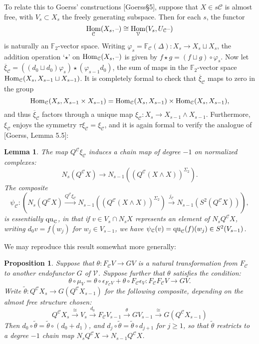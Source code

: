 \documentclass[11pt]{amsart}
\theoremstyle{plain}
\newtheorem{lem}[thm]{Lemma}
\newtheorem{prop}[thm]{Proposition}
\theoremstyle{definition}
\DeclareMathOperator{\Hom}{Hom}
\newcommand{\DASH}{\textup{--}}
\let\phi\varphi
\renewcommand{\to}{\longrightarrow}
\newcommand{\calC}{\mathcal{C}}
\newcommand{\calV}{\mathcal{V}}
\theoremstyle{plain}
\newcommand{\vect}[2]{\calV^{#1}_{#2}}
\newcommand{\quadratic}{\textup{qu}}
\newcommand{\F}{\mathbb{F}}
\begin{document}
\begin{Conventions and notation}
To relate this to Goerss' constructions [Goerss\S5], suppose that $X\in s\calC$ is almost free, with $V_s\subset X_s$ the freely generating subspace. Then for each $s$, the functor 
\[\Hom_\calC(X_s,\DASH)\cong \Hom_\calV(V_s,U_\calC\DASH)\]
is naturally an $\F_2$-vector space. Writing $\phi_s=\F_\calC(\Delta):X_s\to X_s\sqcup X_s$, the addition operation `$\star$' on $\Hom_\calC(X_s,\DASH)$ is given by $f\star g= (f\sqcup g)\circ\phi_s$. Now let
$\overline{\xi}_\calC=((d_0\sqcup d_0)\phi_s)\star(\phi_{s-1}d_0)$, the sum of maps in the $\F_2$-vector space $\textup{Hom}_\calC(X_s,X_{s-1}\sqcup X_{s-1})$. It is completely formal to check that $\overline{\xi}_\calC$ maps to zero in the group
\[\textup{Hom}_\calC(X_s,X_{s-1}\times X_{s-1})=\textup{Hom}_\calC(X_s,X_{s-1})\times \textup{Hom}_\calC(X_s,X_{s-1}),\]
and thus $\overline{\xi}_\calC$ factors through a unique map $\xi_\calC:X_s\to X_{s-1}\wedge X_{s-1}$. Furthermore, $\xi_\calC$ enjoys the symmetry $\tau\xi_\calC=\xi_\calC$, and it is again formal to verify the analogue of [Goerss, Lemma 5.5]:
\begin{lem}\label{psi is basically the quadratic part}
The map $Q^\calC\xi_\calC$ induces a chain map of degree $-1$ on normalized complexes:
\[N_s(Q^{\calC}X)\to N_{s-1}((Q^{\calC}(X\wedge X))^{\Sigma_2}).\]
The composite
\[\psi_\calC:\left(N_s(Q^{\calC}X)\overset{Q^\calC\xi_\calC}{\to} N_{s-1}((Q^{\calC}(X\wedge X))^{\Sigma_2})\overset{j_\calC}{\to} N_{s-1}(S^2(Q^{\calC}X))\right),\]
is essentially $\quadratic_\calC$, in that if $v\in V_s\cap N_sX$ represents an element of $N_sQ^\calC X$, writing $d_0v=f(w_j)$ for $w_j\in V_{s-1}$, we have $\psi_\calC(v)=\quadratic_\calC(f)(w_j)\in S^2(V_{s-1})$.
\end{lem}
We may reproduce this result somewhat more generally:
\begin{prop}\label{general CohOpns given irreducibility}
Suppose that $\theta:F_\calC V\to GV$ is a natural transformation from $F_\calC$ to another endofunctor $G$ of $\vect{}{}$. Suppose further that $\theta$ satisfies the condition:
\[\theta\circ\mu_V=\theta\circ \epsilon_{F_\calC V} +\theta\circ {F_\calC \epsilon_V}:F_\calC F_\calC V\to G V.\]
Write $\widetilde{\theta}:Q^{\calC}X_s\to G(Q^{\calC}X_{s-1})$ for the following composite, depending on the almost free structure chosen:
\[Q^{\calC}X_s\overset{\cong}{\to} V_s\overset{d_0}{\to}F_{\calC}V_{s-1}\overset{\theta}{\to}GV_{s-1}\overset{\cong}{\to}G(Q^{\calC}X_{s-1})\]
Then $d_0\circ\widetilde{\theta}=\widetilde{\theta}\circ(d_0+d_1)$, and $d_j\circ\widetilde{\theta}=\widetilde{\theta}\circ d_{j+1}$ for $j\geq1$, so that $\widetilde{\theta}$ restricts to a degree $-1$ chain map $N_sQ^\calC X\to N_{s-1}Q^\calC X$.

\end{prop}
\end{Conventions and notation}
\end{document}
